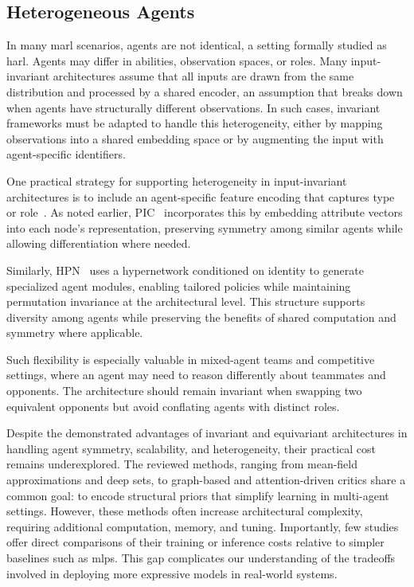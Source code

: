 \subsection{Heterogeneous Agents}
In many \gls{marl} scenarios, agents are not identical, a setting formally studied 
as \gls{harl}. Agents may differ in abilities, observation spaces, or roles. 
Many input-invariant architectures assume that all inputs are drawn from the 
same distribution and processed by a shared encoder, an assumption that breaks 
down when agents have structurally different observations. In such cases, 
invariant frameworks must be adapted to handle this heterogeneity, 
either by mapping observations into a shared embedding space or by 
augmenting the input with agent-specific identifiers.

One practical strategy for supporting heterogeneity in input-invariant architectures 
is to include an agent-specific feature encoding that captures type or 
role~\cite{liu2020b,hao2022,hao2023}. As noted earlier, PIC~\cite{liu2020b}
incorporates this by embedding attribute vectors into each node's representation, 
preserving symmetry among similar agents while allowing differentiation where needed.

Similarly, HPN~\cite{hao2023} uses a hypernetwork conditioned on 
identity to generate specialized agent modules, enabling tailored policies 
while maintaining permutation invariance at the architectural level. 
This structure supports diversity among agents while preserving the 
benefits of shared computation and symmetry where applicable.

Such flexibility is especially valuable in mixed-agent teams and 
competitive settings, where an agent may need to reason differently 
about teammates and opponents. The architecture should remain invariant 
when swapping two equivalent opponents but avoid conflating agents 
with distinct roles.

Despite the demonstrated advantages of invariant and equivariant architectures in handling 
agent symmetry, scalability, and heterogeneity, their practical cost remains underexplored. 
The reviewed methods, ranging from mean-field approximations and deep sets, 
to graph-based and attention-driven critics share a common goal: to encode 
structural priors that simplify learning in multi-agent settings. However, 
these methods often increase architectural complexity, requiring additional computation, 
memory, and tuning. Importantly, few studies offer direct comparisons of their 
training or inference costs relative to simpler baselines such as \glspl{mlp}. 
This gap complicates our understanding of the tradeoffs involved in deploying 
more expressive models in real-world systems.

